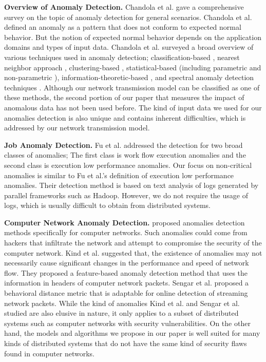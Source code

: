 \documentclass[conference]{IEEEtran.1.8}
\begin{document}
\textbf{Overview of Anomaly Detection.} Chandola et al. \cite{Chandola2009} gave a comprehensive survey on the topic of anomaly detection for general scenarios. Chandola et al. defined an anomaly as a pattern that does not conform to expected normal behavior. But the notion of expected normal behavior depends on the application domains and types of input data. Chandola et al. surveyed a broad overview of various techniques used in anomaly detection; classification-based \cite{Stefano2000, Barbara2001}, nearest neighbor approach \cite{Otey2006}, clustering-based \cite{He2003}, statistical-based (including parametric \cite{Eskin2000} and non-parametric \cite{Chow2002}), information-theoretic-based \cite{Ando2007}, and spectral anomaly detection techniques \cite{Agovic2009}. Although our network transmission model can be classified as one of these methods, the second portion of our paper that measures the impact of anomalous data has not been used before. The kind of input data we used for our anomalies detection is also unique and contains inherent difficulties, which is addressed by our network transmission model.

\textbf{Job Anomaly Detection.} Fu et al. \cite{Fu2009} addressed the detection for two broad classes of anomalies; The first class is work flow execution anomalies and the second class is execution low performance anomalies. Our focus on non-critical anomalies is similar to Fu et al.'s definition of execution low performance anomalies. Their detection method is based on text analysis of logs generated by parallel frameworks such as Hadoop. However, we do not require the usage of logs, which is usually difficult to obtain from distributed systems.

\textbf{Computer Network Anomaly Detection.} \cite{Kind2009, Sengar2009} proposed anomalies detection methods specifically for computer networks. Such anomalies could come from hackers that infiltrate the network and attempt to compromise the security of the computer network. Kind et al. \cite{Kind2009} suggested that, the existence of anomalies may not necessarily cause significant changes in the performance and speed of network flow. They proposed a feature-based anomaly detection method that uses the information in headers of computer network packets. Sengar et al. \cite{Sengar2009} proposed a behavioral distance metric that is adaptable for online detection of streaming network packets. While the kind of anomalies Kind et al. \cite{Kind2009} and Sengar et al. \cite{Sengar2009} studied are also elusive in nature, it only applies to a subset of distributed systems such as computer networks with security vulnerabilities. On the other hand, the models and algorithms we propose in our paper is well suited for many kinds of distributed systems that do not have the same kind of security flaws found in computer networks.
\end{document}
